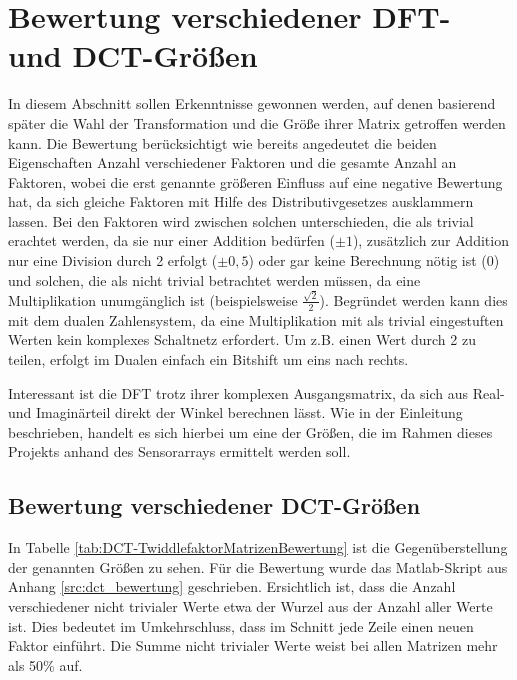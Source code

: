 \section{Bewertung verschiedener DFT- und DCT-Größen}\label{sec:BewertungVerschiedenerGroessen}
In diesem Abschnitt sollen Erkenntnisse gewonnen werden, auf denen basierend später die Wahl der Transformation und die Größe ihrer Matrix getroffen werden kann.
Die Bewertung berücksichtigt wie bereits angedeutet die beiden Eigenschaften Anzahl verschiedener Faktoren und die gesamte Anzahl an Faktoren, wobei die erst genannte 
größeren Einfluss auf eine negative Bewertung hat, da sich gleiche Faktoren mit Hilfe des Distributivgesetzes ausklammern lassen.
Bei den Faktoren wird zwischen solchen unterschieden, die als trivial erachtet werden, da sie nur einer Addition bedürfen ($\pm1$), zusätzlich
zur Addition nur eine Division durch 2 erfolgt ($\pm0,5$) oder gar keine Berechnung nötig ist ($0$) und solchen, die als nicht trivial betrachtet werden müssen, da eine Multiplikation
unumgänglich ist (beispielsweise $\tfrac{\sqrt{2}}{2}$). Begründet werden kann dies mit dem dualen Zahlensystem, da eine Multiplikation mit als trivial eingestuften Werten kein
komplexes Schaltnetz erfordert. Um z.B. einen Wert durch 2 zu teilen, erfolgt im Dualen einfach ein Bitshift um eins nach rechts. 

Interessant ist die DFT trotz ihrer komplexen Ausgangsmatrix, da sich aus Real- und Imaginärteil direkt der Winkel berechnen lässt.
Wie in der Einleitung beschrieben, handelt es sich hierbei um eine der Größen, die im Rahmen dieses Projekts anhand des Sensorarrays ermittelt werden soll.



\subsection{Bewertung verschiedener DCT-Größen}
In Tabelle \ref{tab:DCT-TwiddlefaktorMatrizenBewertung} ist die Gegenüberstellung der genannten Größen zu sehen. Für die Bewertung wurde das 
Matlab-Skript aus Anhang \ref{src:dct_bewertung} geschrieben.
Ersichtlich ist, dass die Anzahl verschiedener nicht trivialer Werte etwa der Wurzel aus der Anzahl aller Werte ist.
Dies bedeutet im Umkehrschluss, dass im Schnitt jede Zeile einen neuen Faktor einführt. Die Summe nicht trivialer Werte weist bei allen Matrizen
mehr als 50$\%$ auf. 

